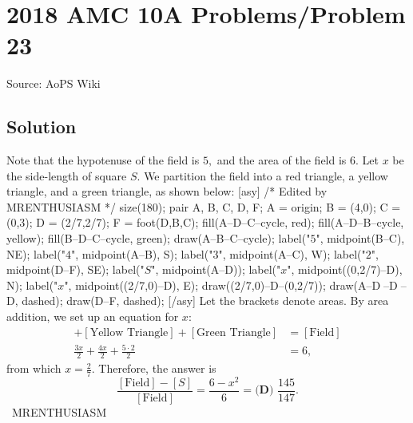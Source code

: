 \documentclass[12pt]{article}
\begin{document}
\section*{{2018 AMC 10A Problems/Problem 23}}
Source: AoPS Wiki

\subsection*{Solution}
Note that the hypotenuse of the field is $5,$ and the area of the field is $6.$ Let $x$ be the side-length of square $S.$ We partition the field into a red triangle, a yellow triangle, and a green triangle, as shown below: [asy] /* Edited by MRENTHUSIASM */ size(180); pair A, B, C, D, F; A = origin; B = (4,0); C = (0,3); D = (2/7,2/7); F = foot(D,B,C); fill(A--D--C--cycle, red); fill(A--D--B--cycle, yellow); fill(B--D--C--cycle, green); draw(A--B--C--cycle); label("$5$", midpoint(B--C), NE); label("$4$", midpoint(A--B), S); label("$3$", midpoint(A--C), W); label("$2$", midpoint(D--F), SE); label("$S$", midpoint(A--D)); label("$x$", midpoint((0,2/7)--D), N); label("$x$", midpoint((2/7,0)--D), E); draw((2/7,0)--D--(0,2/7)); draw(A--D^^B--D^^C--D, dashed); draw(D--F, dashed); [/asy] Let the brackets denote areas. By area addition, we set up an equation for $x:$ \begin{align*} [\text{Red Triangle}]+[\text{Yellow Triangle}]+[\text{Green Triangle}]&=[\text{Field}] \\ \frac{3x}{2}+\frac{4x}{2}+\frac{5\cdot2}{2}&=6, \end{align*} from which $x=\frac27.$ Therefore, the answer is \[\frac{[\text{Field}]-[S]}{[\text{Field}]}=\frac{6-x^2}{6}=\boxed{\textbf{(D) } \frac{145}{147}}.\] ~MRENTHUSIASM
\end{document}
